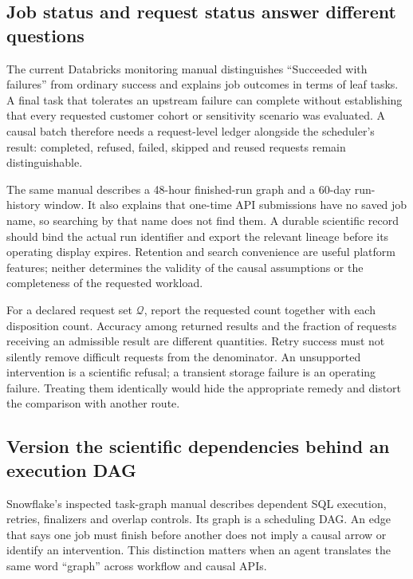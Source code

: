 \subsection{Job status and request status answer different questions}

The current Databricks monitoring manual distinguishes ``Succeeded with
failures'' from ordinary success and explains job outcomes in terms of leaf
tasks. A final task that tolerates an upstream failure can complete without
establishing that every requested customer cohort or sensitivity scenario was
evaluated. A causal batch therefore needs a request-level ledger alongside the
scheduler's result: completed, refused, failed, skipped and reused requests
remain distinguishable.~\citep{exec22_workflow_databricks_monitor}

The same manual describes a 48-hour finished-run graph and a 60-day run-history
window. It also explains that one-time API submissions have no saved job name,
so searching by that name does not find them. A durable scientific record
should bind the actual run identifier and export the relevant lineage before
its operating display expires. Retention and search convenience are useful
platform features; neither determines the validity of the causal assumptions
or the completeness of the requested workload.
\citep{exec22_workflow_databricks_monitor}

For a declared request set $\mathcal Q$, report the requested count together
with each disposition count. Accuracy among returned results and the fraction
of requests receiving an admissible result are different quantities. Retry
success must not silently remove difficult requests from the denominator.
An unsupported intervention is a scientific refusal; a transient storage
failure is an operating failure. Treating them identically would hide the
appropriate remedy and distort the comparison with another route.

\subsection{Version the scientific dependencies behind an execution DAG}

Snowflake's inspected task-graph manual describes dependent SQL execution,
retries, finalizers and overlap controls. Its graph is a scheduling DAG. An
edge that says one job must finish before another does not imply a causal
arrow or identify an intervention. This distinction matters when an agent
translates the same word ``graph'' across workflow and causal APIs.
\citep{exec22_workflow_snowflake_graphs}

